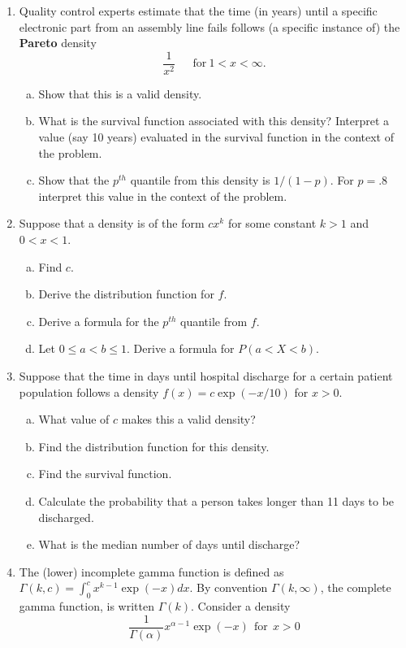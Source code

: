 \documentclass[12pt]{article}
\begin{document}
\begin{enumerate}[1.]
\begin{enumerate}[a.]
  \end{enumerate}
\item Quality control experts estimate that the time (in years) until a specific electronic 
  part from an assembly line fails follows (a specific instance of) the {\bf Pareto} density
$$
\frac{1}{x^2} ~~~~~~~\mbox{for}~ 1 < x < \infty.
$$
\begin{enumerate}[a.]
\item Show that this is a valid density.
\item What is the survival function associated with this density?
  Interpret a value (say 10 years) evaluated in the survival function in the context of the problem.
\item Show that the $p^{th}$ quantile from this density is $1/(1 -p)$. For $p=.8$ interpret this
  value in the context of the problem.
\end{enumerate}
\item  Suppose that a density is of the form $cx^k$ for some constant $k > 1$ and $0 < x < 1$.
  \begin{enumerate}[a.]
  \item Find $c$.
  \item Derive the distribution function for $f$.
  \item Derive a formula for the $p^{th}$ quantile from $f$.
  \item Let $0 \leq a < b \leq 1$. Derive a formula for $P(a < X < b)$.
  \end{enumerate}
\item Suppose that the time in days until hospital discharge for a certain patient population
follows a density $f(x) = c\exp(-x/10)$ for $x > 0$. 
\begin{enumerate}[a.]
	\item What value of $c$ makes this a valid density?
	\item Find the distribution function for this density.
	\item Find the survival function.
	\item Calculate the probability that a person takes longer than 11 days to be discharged.\
	\item What is the median number of days until discharge?
\end{enumerate}
\item The (lower) incomplete gamma function is 
	defined as $\Gamma(k, c) = \int_{0}^c x^{k-1}\exp(-x)dx$.
	By convention $\Gamma(k, \infty)$, the complete gamma function, is written $\Gamma(k)$.
	Consider a density
	$$
	\frac{1}{\Gamma(\alpha)} x^{\alpha - 1} \exp(-x) ~~ \mbox{for} ~~ x > 0
$$
\end{enumerate}
\end{document}
